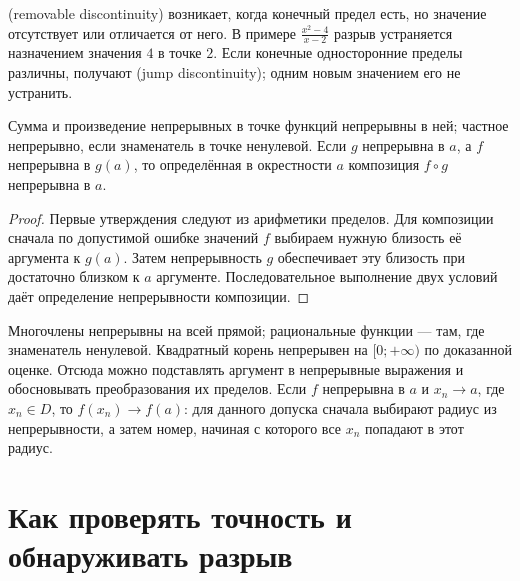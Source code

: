  (removable discontinuity) возникает, когда конечный предел есть, но значение отсутствует или отличается от него. В примере \(\frac{x^2-4}{x-2}\) разрыв устраняется назначением значения \(4\) в точке \(2\). Если конечные односторонние пределы различны, получают  (jump discontinuity); одним новым значением его не устранить.

\begin{theorem}\label{thm:legacy-c19-6}
Сумма и произведение непрерывных в точке функций непрерывны в ней; частное непрерывно, если знаменатель в точке ненулевой. Если \(g\) непрерывна в \(a\), а \(f\) непрерывна в \(g(a)\), то определённая в окрестности \(a\) композиция \(f\circ g\) непрерывна в \(a\).
\end{theorem}
\begin{proof}
Первые утверждения следуют из арифметики пределов. Для композиции сначала по допустимой ошибке значений \(f\) выбираем нужную близость её аргумента к \(g(a)\). Затем непрерывность \(g\) обеспечивает эту близость при достаточно близком к \(a\) аргументе. Последовательное выполнение двух условий даёт определение непрерывности композиции.
\end{proof}

Многочлены непрерывны на всей прямой; рациональные функции --- там, где знаменатель ненулевой. Квадратный корень непрерывен на \([0;+\infty)\) по доказанной оценке. Отсюда можно подставлять аргумент в непрерывные выражения и обосновывать преобразования их пределов. Если \(f\) непрерывна в \(a\) и \(x_n\to a\), где \(x_n\in D\), то \(f(x_n)\to f(a)\): для данного допуска сначала выбирают радиус из непрерывности, а затем номер, начиная с которого все \(x_n\) попадают в этот радиус.

\section{Как проверять точность и обнаруживать разрыв}

